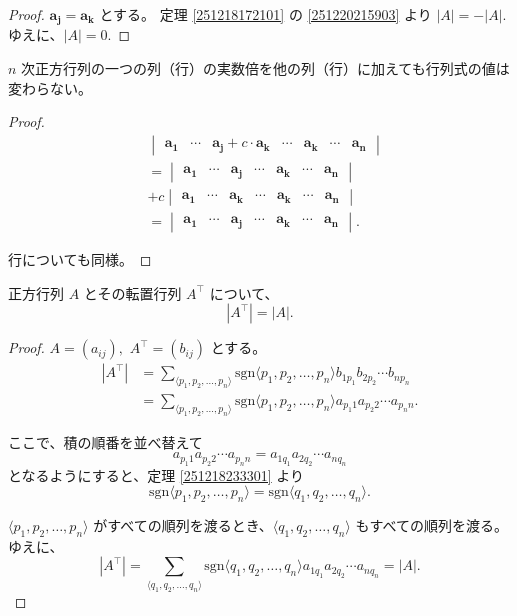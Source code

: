 \begin{proof}
  \(\bm{a_j}=\bm{a_k}\) とする。
  定理 \ref{251218172101} の \ref{251220215903} より \(|A|=-|A|.\)
  ゆえに、\(|A|=0.\)
\end{proof}

\begin{thm}
  \(n\) 次正方行列の一つの列（行）の実数倍を他の列（行）に加えても行列式の値は変わらない。
\end{thm}

\begin{proof}
  \begin{align*}
    &
    \begin{vmatrix}
      \bm{a_1} & \cdots & \bm{a_j}+c\cdot\bm{a_k} & \cdots & \bm{a_k} & \cdots & \bm{a_n}
    \end{vmatrix} \\
    &=
    \begin{vmatrix}
      \bm{a_1} & \cdots & \bm{a_j} & \cdots & \bm{a_k} & \cdots & \bm{a_n}
    \end{vmatrix} \\
    &+c
    \begin{vmatrix}
      \bm{a_1} & \cdots & \bm{a_k} & \cdots & \bm{a_k} & \cdots & \bm{a_n}
    \end{vmatrix} \\
    &=
    \begin{vmatrix}
      \bm{a_1} & \cdots & \bm{a_j} & \cdots & \bm{a_k} & \cdots & \bm{a_n}
    \end{vmatrix}.
  \end{align*}

  行についても同様。
\end{proof}

\begin{thm}\label{260111170401}
  正方行列 \(A\) とその転置行列 \(A^\top\) について、
  \[|A^\top|=|A|.\]
\end{thm}

\begin{proof}
  \(A=(a_{ij}),\) \(A^\top=(b_{ij})\) とする。
  \begin{align*}
    |A^\top| &= \sum_{\langle p_1,p_2,\ldots,p_n\rangle}\mathrm{sgn}\langle p_1,p_2,\ldots,p_n\rangle b_{1 p_1}b_{2 p_2}\cdots b_{n p_n} \\
             &= \sum_{\langle p_1,p_2,\ldots,p_n\rangle}\mathrm{sgn}\langle p_1,p_2,\ldots,p_n\rangle a_{p_1 1}a_{p_2 2}\cdots a_{p_n n}.
  \end{align*}

  ここで、積の順番を並べ替えて
  \[a_{p_1 1}a_{p_2 2}\cdots a_{p_n n}=a_{1 q_1}a_{2 q_2}\cdots a_{n q_n}\]
  となるようにすると、定理 \ref{251218233301} より
  \[\mathrm{sgn}\langle p_1,p_2,\ldots,p_n\rangle=\mathrm{sgn}\langle q_1,q_2,\ldots,q_n\rangle.\]

  \(\langle p_1,p_2,\ldots,p_n\rangle\) がすべての順列を渡るとき、\(\langle q_1,q_2,\ldots,q_n\rangle\) もすべての順列を渡る。
  ゆえに、
  \[|A^\top|=\sum_{\langle q_1,q_2,\ldots,q_n\rangle}\mathrm{sgn}\langle q_1,q_2,\ldots,q_n\rangle a_{1 q_1}a_{2 q_2}\cdots a_{n q_n}=|A|.\]
\end{proof}


